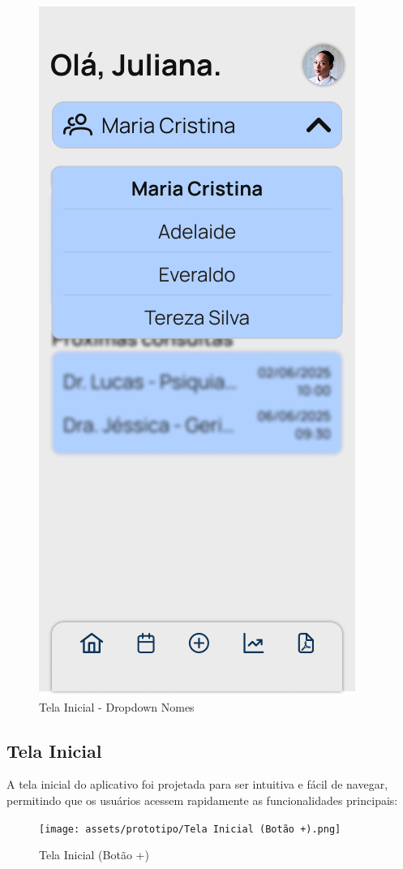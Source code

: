 \begin{figure}[!htbp]
	\centering
	\includegraphics[width=0.6\linewidth]{assets/prototipo/Tela Inicial - Dropdown Nomes.png}
	\caption{Tela Inicial - Dropdown Nomes}
	\label{tela_inicial_dropdown_nomes}
\end{figure}

\subsection{Tela Inicial}

A tela inicial do aplicativo \nomeprojeto foi projetada para ser intuitiva e fácil de navegar, permitindo que os usuários acessem rapidamente as funcionalidades principais:

\begin{figure}[!htbp]
	\centering
	\texttt{[image: assets/prototipo/Tela Inicial (Botão +).png]}
	\caption{Tela Inicial (Botão +)}
	\label{tela_inicial_botao_mais}
\end{figure}

